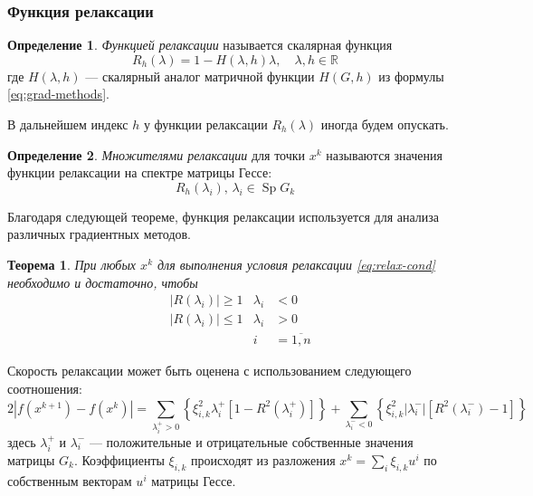 \documentclass{article}
\renewcommand{\leq}{\leqslant}
\renewcommand{\geq}{\geqslant}
\providecommand{\neword}{\emph}
\providecommand{\abs}[1]{\left \lvert{#1}\right \rvert}
\providecommand{\set}[1]{\mathbb{#1}}
\DeclareMathOperator{\Sp}{Sp}
\newtheorem{thm}{Теорема}[section]
\theoremstyle{remark}
\theoremstyle{definition}
\newtheorem{dfn}{Определение}[section]
\numberwithin{equation}{section}
\begin{document}
\subsubsection{Функция релаксации}

\begin{dfn}
  \neword{Функцией релаксации} называется скалярная функция
  \begin{equation}
    \label{eq:relax-fun}
    R_h(\lambda) = 1 - H(\lambda, h)\lambda,\quad \lambda,h \in \set{R}
  \end{equation}
  где $H(\lambda, h)$ — скалярный аналог матричной функции $H(G, h)$
  из формулы \eqref{eq:grad-methods}.
\end{dfn}
В дальнейшем индекс $h$ у функции релаксации $R_h(\lambda)$ иногда
будем опускать.

\begin{dfn}
  \neword{Множителями релаксации} для точки $x^k$ называются значения
  функции релаксации на спектре матрицы Гессе:
  \begin{equation}
    \label{eq:relax-fac}
    R_h(\lambda_i),\, \lambda_i \in \Sp{G_k}
  \end{equation}
\end{dfn}

Благодаря следующей теореме, функция релаксации используется для
анализа различных градиентных методов.

\begin{thm}
  \label{thm:relax-thm}
  При любых $x^k$ для выполнения условия релаксации
  \eqref{eq:relax-cond} необходимо и достаточно, чтобы
  \begin{equation}
    \label{eq:relax-thm}
    \begin{aligned}
      & \abs{R(\lambda_i)} \geq 1 & \lambda_i& < 0 \\
      & \abs{R(\lambda_i)} \leq 1 & \lambda_i& > 0\\
      &&i& = \overline{1, n}
    \end{aligned}
  \end{equation}
\end{thm}



Скорость релаксации может быть оценена с использованием следующего
соотношения:
\begin{equation}
  \label{eq:relax-speed}
  2\abs{f(x^{k+1})-f(x^k)}=\sum_{\lambda_i^+>0} \left\{\xi_{i,k}^2
    \lambda_i^+ [1-R^2(\lambda_i^+)]\right\} + \sum_{\lambda_i^-<0} \left\{\xi_{i,k}^2
    \abs{\lambda_i^-} [R^2(\lambda_i^-)-1]\right\}
\end{equation}
здесь $\lambda_i^+$ и $\lambda_i^-$ — положительные и отрицательные
собственные значения матрицы $G_k$. Коэффициенты $\xi_{i,k}$
происходят из разложения $x^k=\sum_i{\xi_{i,k}u^i}$ по собственным
векторам $u^i$ матрицы Гессе.
\end{document}
